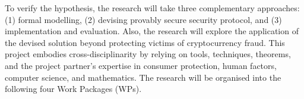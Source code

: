 \vs

To verify the hypothesis, the research will take three complementary approaches: (1) formal modelling, (2) devising provably secure security protocol, and (3) implementation and evaluation. Also, the research will explore the application of the devised solution beyond protecting victims of cryptocurrency fraud. This project embodies cross-disciplinarity by relying on tools, techniques, theorems, and the project partner's expertise in consumer protection, human factors, computer science, and mathematics. The research will be organised into the following four Work Packages (WPs). 


 
 
 
 
 
 
 
 
 
% 



 
